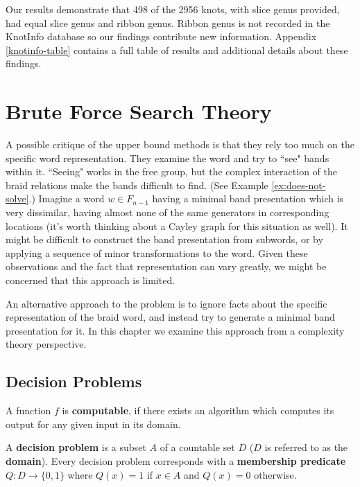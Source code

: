 \documentclass[12pt]{thesis}
\begin{document}
Our results demonstrate that 498 of the 2956 knots, with slice genus provided,
had equal slice genus and ribbon genus.
Ribbon genus is not recorded in the KnotInfo database
so our findings contribute new information.
Appendix \ref{knotinfo-table} contains a full table of results and
 additional details about these findings.

\chapter{Brute Force Search Theory}

\label{chap:complexity}

A possible critique of the upper bound methods is that they rely too much on
the specific word representation.
They examine the word and try to ``see" bands within it.
``Seeing" works in the free group,
but the complex interaction of the braid relations make the bands
difficult to find. (See Example \ref{ex:does-not-solve}.)
Imagine a word $w \in F_{n-1}$ having a minimal band presentation
which is very dissimilar, having almost none of the same generators
in corresponding locations (it's worth thinking about a Cayley graph for this situation as well).
It might be difficult to construct the band presentation
from subwords, or by applying a sequence of minor transformations to the word.
Given these observations and the fact that representation can vary greatly,
we might be concerned that this approach is limited. 

An alternative approach to the problem is to ignore facts about the specific representation
of the braid word, and instead try to generate a minimal band presentation for it.
In this chapter we examine this approach from a complexity theory perspective.

\section{Decision Problems}

\begin{definition}
    A function $f$ is \textbf{computable}, if there exists an algorithm 
    which computes its output for any given input in its domain.
\end{definition}

\begin{definition}
    A \textbf{decision problem} is a subset $A$ of a countable set $D$ ($D$ is referred to as the \textbf{domain}).
    Every decision problem corresponds with a \textbf{membership predicate}
    $Q \colon D \rightarrow \{ 0, 1 \}$
    where $Q(x) = 1$ if $x \in A$ and $Q(x) = 0$ otherwise.
\end{definition}
\end{document}
